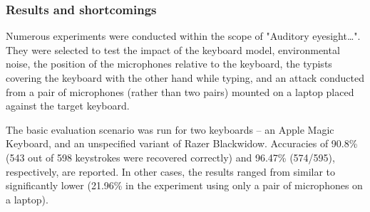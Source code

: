\documentclass[../main.tex]{subfiles}
\begin{document}
\subsubsection{Results and shortcomings} \label{sec:results_and_shortcomings}

Numerous experiments were conducted within the scope of "Auditory eyesight\ldots{}".
They were selected to test the impact of the keyboard model, environmental noise, the position of the 
microphones relative to the keyboard, the typists covering the keyboard with the other hand while 
typing, and an attack conducted from a pair of microphones (rather than two pairs) mounted on a laptop placed against the target keyboard. 

The basic evaluation scenario was run for two keyboards -- an Apple Magic Keyboard, and an unspecified
variant of Razer Blackwidow. Accuracies of 90.8\% (543 out of 598 keystrokes were recovered correctly) and 96.47\% (574/595), respectively, are reported. 
In other cases, the results ranged from similar to significantly lower (21.96\% in the experiment 
using only a  pair of microphones on a laptop).
\end{document}
